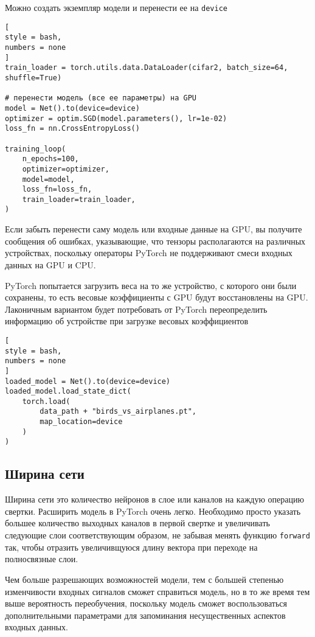 \documentclass[%
	11pt,
	a4paper,
	utf8,
		]{article}
\begin{document}
Можно создать экземпляр модели и перенести ее на \verb|device|
\begin{lstlisting}[
style = bash,
numbers = none
]
train_loader = torch.utils.data.DataLoader(cifar2, batch_size=64, shuffle=True)

# перенести модель (все ее параметры) на GPU
model = Net().to(device=device)
optimizer = optim.SGD(model.parameters(), lr=1e-02)
loss_fn = nn.CrossEntropyLoss()

training_loop(
    n_epochs=100,
    optimizer=optimizer,
    model=model,
    loss_fn=loss_fn,
    train_loader=train_loader,
)
\end{lstlisting}

Если забыть перенести саму модель или входные данные на GPU, вы получите сообщения об ошибках, указывающие, что тензоры располагаются на различных устройствах, поскольку операторы PyTorch не поддерживают смеси входных данных на GPU и CPU.

PyTorch попытается загрузить веса на то же устройство, с которого они были сохранены, то есть весовые коэффициенты с GPU будут восстановлены на GPU. Лаконичным вариантом будет потребовать от PyTorch переопределить информацию об устройстве при загрузке весовых коэффициентов
\begin{lstlisting}[
style = bash,
numbers = none
]
loaded_model = Net().to(device=device)
loaded_model.load_state_dict(
    torch.load(
        data_path + "birds_vs_airplanes.pt",
        map_location=device
    )
)
\end{lstlisting}

\subsection{Ширина сети}

Ширина сети это количество нейронов в слое или каналов на каждую операцию свертки. Расширить модель в PyTorch очень легко. Необходимо просто указать большее количество выходных каналов в первой свертке и увеличивать следующие слои соответствующим образом, не забывая менять функцию \verb|forward| так, чтобы отразить увеличивщуюся длину вектора при переходе на полносвязные слои.

Чем больше разрешающих возможностей модели, тем с большей степенью изменчивости входных сигналов сможет справиться модель, но в то же время тем выше вероятность переобучения, поскольку модель сможет воспользоваться дополнительными параметрами для запоминания несущественных аспектов входных данных. 
\end{document}
